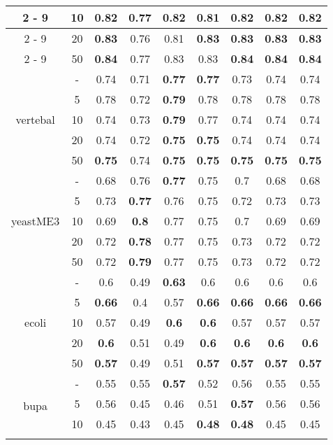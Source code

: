 \documentclass{article}%
\begin{document}
\begin{tabular}{c|c|ccccccc}
\cline{2%
-%
9}%
&10&\textbf{0.82}&0.77&\textbf{0.82}&0.81&\textbf{0.82}&\textbf{0.82}&\textbf{0.82}\\%
\cline{2%
-%
9}%
&20&\textbf{0.83}&0.76&0.81&\textbf{0.83}&\textbf{0.83}&\textbf{0.83}&\textbf{0.83}\\%
\cline{2%
-%
9}%
&50&\textbf{0.84}&0.77&0.83&0.83&\textbf{0.84}&\textbf{0.84}&\textbf{0.84}\\%
\hline%
\multirow{5}{*}{vertebal}&{-}&0.74&0.71&\textbf{0.77}&\textbf{0.77}&0.73&0.74&0.74\\%
\cline{2%
-%
9}%
&5&0.78&0.72&\textbf{0.79}&0.78&0.78&0.78&0.78\\%
\cline{2%
-%
9}%
&10&0.74&0.73&\textbf{0.79}&0.77&0.74&0.74&0.74\\%
\cline{2%
-%
9}%
&20&0.74&0.72&\textbf{0.75}&\textbf{0.75}&0.74&0.74&0.74\\%
\cline{2%
-%
9}%
&50&\textbf{0.75}&0.74&\textbf{0.75}&\textbf{0.75}&\textbf{0.75}&\textbf{0.75}&\textbf{0.75}\\%
\hline%
\multirow{5}{*}{yeastME3}&{-}&0.68&0.76&\textbf{0.77}&0.75&0.7&0.68&0.68\\%
\cline{2%
-%
9}%
&5&0.73&\textbf{0.77}&0.76&0.75&0.72&0.73&0.73\\%
\cline{2%
-%
9}%
&10&0.69&\textbf{0.8}&0.77&0.75&0.7&0.69&0.69\\%
\cline{2%
-%
9}%
&20&0.72&\textbf{0.78}&0.77&0.75&0.73&0.72&0.72\\%
\cline{2%
-%
9}%
&50&0.72&\textbf{0.79}&0.77&0.75&0.73&0.72&0.72\\%
\hline%
\multirow{5}{*}{ecoli}&{-}&0.6&0.49&\textbf{0.63}&0.6&0.6&0.6&0.6\\%
\cline{2%
-%
9}%
&5&\textbf{0.66}&0.4&0.57&\textbf{0.66}&\textbf{0.66}&\textbf{0.66}&\textbf{0.66}\\%
\cline{2%
-%
9}%
&10&0.57&0.49&\textbf{0.6}&\textbf{0.6}&0.57&0.57&0.57\\%
\cline{2%
-%
9}%
&20&\textbf{0.6}&0.51&0.49&\textbf{0.6}&\textbf{0.6}&\textbf{0.6}&\textbf{0.6}\\%
\cline{2%
-%
9}%
&50&\textbf{0.57}&0.49&0.51&\textbf{0.57}&\textbf{0.57}&\textbf{0.57}&\textbf{0.57}\\%
\hline%
\multirow{5}{*}{bupa}&{-}&0.55&0.55&\textbf{0.57}&0.52&0.56&0.55&0.55\\%
\cline{2%
-%
9}%
&5&0.56&0.45&0.46&0.51&\textbf{0.57}&0.56&0.56\\%
\cline{2%
-%
9}%
&10&0.45&0.43&0.45&\textbf{0.48}&\textbf{0.48}&0.45&0.45\\%
\cline{2%
}
\end{tabular}
\end{document}
